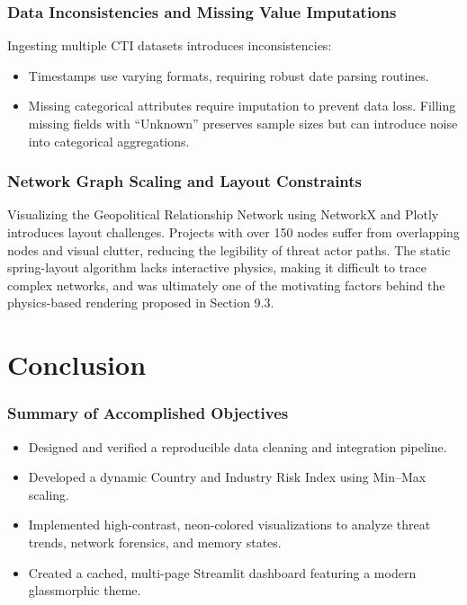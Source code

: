 \documentclass[a4paper, 12pt]{report}
\begin{document}
\subsection{Data Inconsistencies and Missing Value Imputations}
Ingesting multiple CTI datasets introduces inconsistencies:
\begin{itemize}
    \item Timestamps use varying formats, requiring robust date parsing routines.
    \item Missing categorical attributes require imputation to prevent data loss. Filling missing fields with ``Unknown'' preserves sample sizes but can introduce noise into categorical aggregations.
\end{itemize}

\subsection{Network Graph Scaling and Layout Constraints}
Visualizing the Geopolitical Relationship Network using NetworkX and Plotly introduces layout challenges. Projects with over 150 nodes suffer from overlapping nodes and visual clutter, reducing the legibility of threat actor paths. The static spring-layout algorithm lacks interactive physics, making it difficult to trace complex networks, and was ultimately one of the motivating factors behind the physics-based rendering proposed in Section 9.3.

\chapter{Conclusion}

\subsection{Summary of Accomplished Objectives}
\begin{itemize}
    \item Designed and verified a reproducible data cleaning and integration pipeline.
    \item Developed a dynamic Country and Industry Risk Index using Min--Max scaling.
    \item Implemented high-contrast, neon-colored visualizations to analyze threat trends, network forensics, and memory states.
    \item Created a cached, multi-page Streamlit dashboard featuring a modern glassmorphic theme.
\end{itemize}
\end{document}
